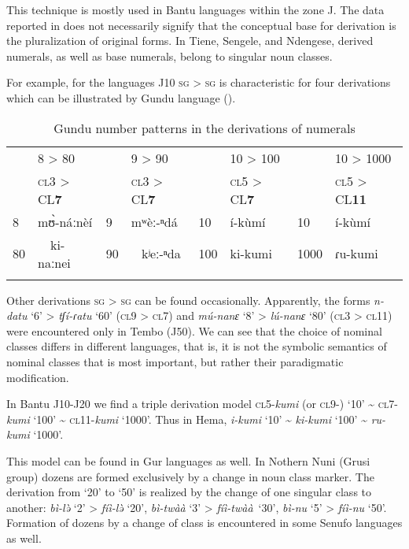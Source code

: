 This technique is mostly used in Bantu languages within the zone J. The data reported in  does not necessarily signify that the conceptual base for derivation is the pluralization of original forms. In Tiene, Sengele, and Ndengese, derived numerals, as well as base numerals, belong to singular noun classes. 

For example, for the languages J10 \textsc{sg} > \textsc{sg} is characteristic for four derivations which can be illustrated by Gundu language ().


\begin{table}
\caption{Gundu number patterns in the derivations of numerals}
\label{tab:1:22}

\begin{tabularx}{\textwidth}{ll ll ll ll}
\lsptoprule

&8 > 80 && 9 > 90 &&10 > 100 && 10 > 1000\\
&\textsc{cl}3 > CL\textbf{7} && \textsc{cl}3 > CL\textbf{7} && \textsc{cl}5 > CL\textbf{7} && \textsc{cl}5 > CL\textbf{11}\\
\midrule
8 &  m{\`{ʊ}}-n{\'{a}}ːn{\`{e}}{\'{i}} & 9 &  mʷ{\`{e}}ː-ⁿd{\'{a}} & 10 &  {\'{i}}-k{\`{u}}m{\'{i}} & 10 &  {\'{i}}-k{\`{u}}m{\'{i}}\\
80 & ~~ki-naːnei & 90 & ~ kʲeː-ⁿda & 100 &  ki-kumi & 1000 &  ɾu-kumi\\
\lspbottomrule
\end{tabularx}
\end{table}

Other derivations \textsc{sg} > \textsc{sg} can be found occasionally. Apparently, the forms \textit{n-datu} ‘6’ > \textit{tʃ{\'{i}}-ɾatu} ‘60’ (\textsc{cl}9 > \textsc{cl}7) and \textit{m{\'{u}}-nanɛ}  ‘8’ > \textit{l{\'{u}}-nanɛ} ‘80’ (\textsc{cl}3 > \textsc{cl}11) were encountered only in Tembo (J50). We can see that the choice of nominal classes differs in different languages, that is, it is not the symbolic semantics of nominal classes that is most important, but rather their paradigmatic modification. 

In Bantu J10-J20 we find a triple derivation model \textsc{cl}5-\textit{kumi} (or \textsc{cl}9-) ‘10’ {\textasciitilde} \textsc{cl}7-\textit{kumi} ‘100’ {\textasciitilde} \textsc{cl}11-\textit{kumi} ‘1000’. Thus in Hema, \textit{i-kumi} ‘10’ {\textasciitilde} \textit{ki-kumi} ‘100’ {\textasciitilde} \textit{ru-kumi} ‘1000’.

This model can be found in Gur languages as well. In Nothern Nuni (Grusi group) dozens are formed exclusively by a change in noun class marker. The derivation from ‘20’ to ‘50’ is realized by the change of one singular class to another: \textit{bì-l{\`{ə}}} ‘2’ > \textit{f{\'{i}}ì-l{\`{ə}}} ‘20’, \textit{bì-tw{\`{a}}{\`{a}}} ‘3’ > \textit{f{\'{i}}ì-tw{\`{a}}{\`{a}}}~‘30’, \textit{bì-nu} ‘5’ > \textit{f{\'{i}}ì-nu} ‘50’. Formation of dozens by a change of class is encountered in some Senufo languages as well. 

